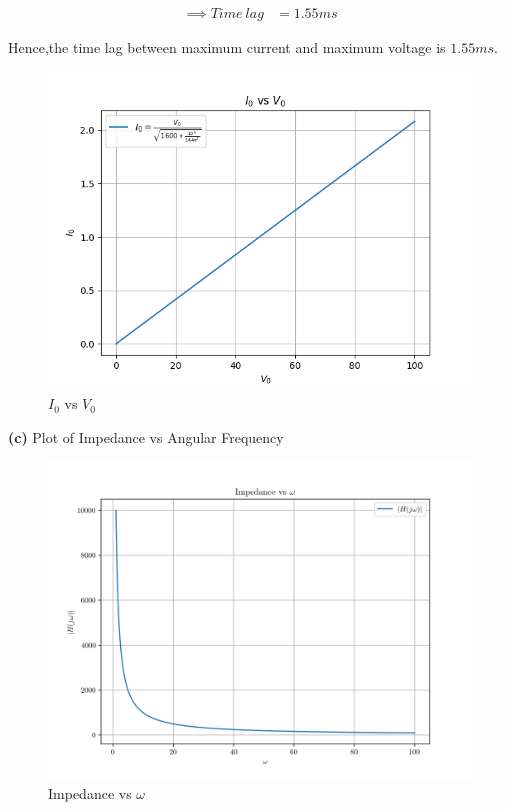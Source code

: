 \documentclass[journal,12pt,twocolumn]{IEEEtran}
\theoremstyle{remark}
\begin{document}
\begin{align}
	\label{eq:tri-pts/17}\implies Time\: lag &= 1.55ms
\end{align}

Hence,the time lag between maximum current and maximum voltage is $1.55ms$.\\

\vspace{0.5cm}

\begin{figure}[h]
    \centering
    \includegraphics[width = 2.4 in, height = 1.6 in]{figs/fig5.png}
    \caption{$I_0$ vs $V_0$}
    \label{fig:h_plot}
\end{figure}

\textbf{(c)} Plot of Impedance vs Angular Frequency
\begin{figure}[h]
    \centering
    \includegraphics[width = 2.4 in, height = 1.6 in]{figs/fig3.png}
    \caption{Impedance vs $\omega$}
    \label{fig:h_plot}
\end{figure}
\end{document}
